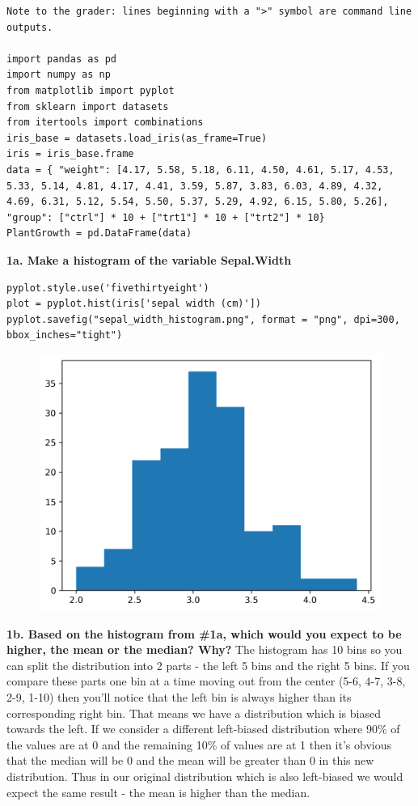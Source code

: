 \documentclass[preview, margin=0.5in]{standalone}
\begin{document}
\begin{verbatim}
Note to the grader: lines beginning with a ">" symbol are command line outputs.

import pandas as pd
import numpy as np
from matplotlib import pyplot
from sklearn import datasets
from itertools import combinations
iris_base = datasets.load_iris(as_frame=True)
iris = iris_base.frame
data = { "weight": [4.17, 5.58, 5.18, 6.11, 4.50, 4.61, 5.17, 4.53, 5.33, 5.14, 4.81, 4.17, 4.41, 3.59, 5.87, 3.83, 6.03, 4.89, 4.32, 4.69, 6.31, 5.12, 5.54, 5.50, 5.37, 5.29, 4.92, 6.15, 5.80, 5.26], "group": ["ctrl"] * 10 + ["trt1"] * 10 + ["trt2"] * 10}
PlantGrowth = pd.DataFrame(data)
\end{verbatim}
\textbf{1a. Make a histogram of the variable Sepal.Width}
\begin{verbatim}
pyplot.style.use('fivethirtyeight')
plot = pyplot.hist(iris['sepal width (cm)'])
pyplot.savefig("sepal_width_histogram.png", format = "png", dpi=300, bbox_inches="tight")
\end{verbatim}
\begin{figure}
    \includegraphics[]{sepal_width_histogram.png}
\end{figure}
\textbf{1b. Based on the histogram from \#1a, which would you expect to be higher, the mean or the median? Why?}
The histogram has 10 bins so you can split the distribution into 2 parts - the left 5 bins and the right 5 bins. If you compare these parts one bin at a time moving out from the center (5-6, 4-7, 3-8, 2-9, 1-10) then you'll notice that the left bin is always higher than its corresponding right bin. That means we have a distribution which is biased towards the left. If we consider a different left-biased distribution where 90\% of the values are at 0 and the remaining 10\% of values are at 1 then it's obvious that the median will be 0 and the mean will be greater than 0 in this new distribution. Thus in our original distribution which is also left-biased we would expect the same result - the mean is higher than the median.
\end{document}
